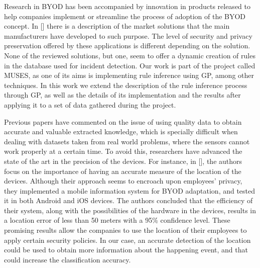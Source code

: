Research in BYOD has been accompanied by innovation in products released
to help companies implement or streamline the process of adoption of the BYOD
concept. In [\cite{de2015corporate}] there is a description of the
market solutions that the main manufacturers have developed to such
purpose. The level of security and privacy preservation offered by
these applications is different depending on the solution.
None of the reviewed solutions, but one, seem to offer a dynamic
creation of rules in the database used for incident detection. Our work is part of the project called MUSES, as one of its aims is implementing rule inference using GP, among other techniques. In this work we extend the description of the
rule inference process through GP, as well as the details of its implementation
and the results after applying it to a set of data gathered during the project. 


Previous papers have commented on the issue of using quality data to obtain accurate and valuable extracted knowledge, which is specially difficult when dealing with datasets taken from real world problems, where the sensors cannot work properly at a certain time.
To avoid this, researchers have advanced the state of the art in the precision of the
devices. For instance, in [\cite{rios2015mobile}], the authors focus on
the importance of having an accurate measure of the location of the
devices. Although their approach seems to encroach upon employees'
privacy, they implemented a mobile information system for BYOD
adaptation, and tested it in both Android and iOS devices. The authors
concluded that the efficiency of their system, along with the
possibilities of the hardware in the devices, results in a location
error of less than 50 meters with a 95\% confidence level. These
promising results allow the companies to use the location of their
employees to apply certain security policies. In our case, an accurate detection of the location could be used to obtain more information about the happening event, and that could increase the classification accuracy. 


